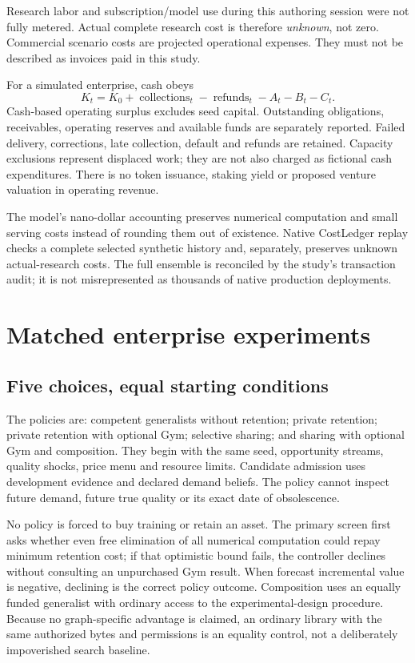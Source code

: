 \documentclass[11pt,letterpaper]{article}
\begin{document}
Research labor and subscription/model use during this authoring session were not fully metered. Actual complete research cost is therefore \emph{unknown}, not zero. Commercial scenario costs are projected operational expenses. They must not be described as invoices paid in this study.

For a simulated enterprise, cash obeys
\begin{equation}
 K_t=K_0+\operatorname{collections}_t-\operatorname{refunds}_t
      -A_t-B_t-C_t.
 \label{eq:cash}
\end{equation}
Cash-based operating surplus excludes seed capital. Outstanding obligations, receivables, operating reserves and available funds are separately reported. Failed delivery, corrections, late collection, default and refunds are retained. Capacity exclusions represent displaced work; they are not also charged as fictional cash expenditures. There is no token issuance, staking yield or proposed venture valuation in operating revenue.

The model's nano-dollar accounting preserves numerical computation and small serving costs instead of rounding them out of existence. Native CostLedger replay checks a complete selected synthetic history and, separately, preserves unknown actual-research costs. The full ensemble is reconciled by the study's transaction audit; it is not misrepresented as thousands of native production deployments.

\section{Matched enterprise experiments}

\subsection{Five choices, equal starting conditions}

The policies are: competent generalists without retention; private retention; private retention with optional Gym; selective sharing; and sharing with optional Gym and composition. They begin with the same seed, opportunity streams, quality shocks, price menu and resource limits. Candidate admission uses development evidence and declared demand beliefs. The policy cannot inspect future demand, future true quality or its exact date of obsolescence.

No policy is forced to buy training or retain an asset. The primary screen first asks whether even free elimination of all numerical computation could repay minimum retention cost; if that optimistic bound fails, the controller declines without consulting an unpurchased Gym result. When forecast incremental value is negative, declining is the correct policy outcome. Composition uses an equally funded generalist with ordinary access to the experimental-design procedure. Because no graph-specific advantage is claimed, an ordinary library with the same authorized bytes and permissions is an equality control, not a deliberately impoverished search baseline.
\end{document}
